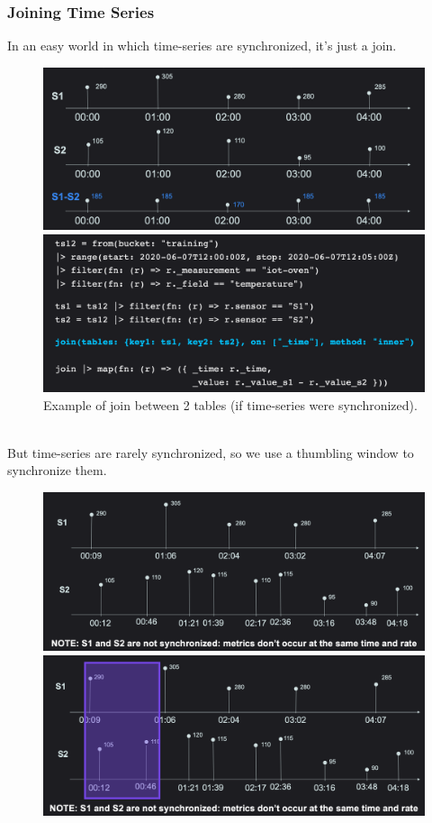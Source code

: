 \documentclass[10pt,a4paper]{article}
\begin{document}
\subsubsection{Joining Time Series}
 In an easy world in which time-series are synchronized, it's just a join.
  \begin{figure}[ht!]
\begin{minipage}{.5\textwidth}
  \centering
  \includegraphics[width=.8\linewidth]{images/flux-join}
\end{minipage}%
\begin{minipage}{.5\textwidth}
  \centering
  \includegraphics[width=.8\linewidth]{images/flux-join2}
\end{minipage}
\caption{Example of join between 2 tables (if time-series were synchronized).}
\end{figure} \\
 But time-series are rarely synchronized, so we use a thumbling window to synchronize them.
   \begin{figure}[ht!]
\begin{minipage}{.5\textwidth}
  \centering
  \includegraphics[width=.8\linewidth]{images/flux-join-unsync}
\end{minipage}%
\begin{minipage}{.5\textwidth}
  \centering
  \includegraphics[width=.8\linewidth]{images/flux-join-unsync2}
\end{minipage}
\end{figure}
\end{document}
